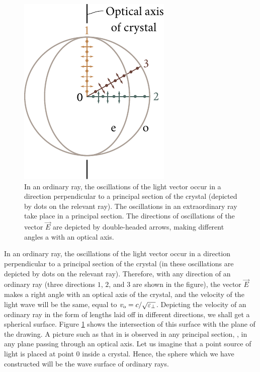 \begin{figure}[t]
	\begin{center}
		\includegraphics[scale=0.95]{figures/ch_19/fig_19_9.pdf}
        \caption[]{In an ordinary ray, the oscillations of the light vector occur in a direction perpendicular to a principal section of the crystal (depicted by dots on the relevant ray). The oscillations in an extraordinary ray take place in a principal section. The directions of oscillations of the vector $\vec{E}$ are depicted by double-headed arrows, making different angles a with an optical axis.}
		\label{fig:19_9}
	\end{center}
	\vspace{-0.8cm}
\end{figure}

In an ordinary ray, the oscillations of the light vector occur in a direction perpendicular to a principal section of the crystal (in  these oscillations are depicted by dots on the relevant ray).
Therefore, with any direction of an ordinary ray (three directions $1$, $2$, and $3$ are shown in the figure), the vector $\vec{E}$ makes a right angle with an optical axis of the crystal, and the velocity of the light wave will be the same, equal to $v_{\text{o}}=c/\sqrt{\varepsilon_{\perp}}$.
Depicting the velocity of an ordinary ray in the form of lengths laid off in different directions,
we shall get a spherical surface.
Figure \ref{fig:19_9} shows the intersection of this surface with the plane of the drawing.
A picture such as that in  is observed in any principal section, \ie, in any plane passing through an optical axis.
Let us imagine that a point source of light is placed at point $0$ inside a crystal.
Hence, the sphere which we have constructed will be the wave surface of ordinary rays.

